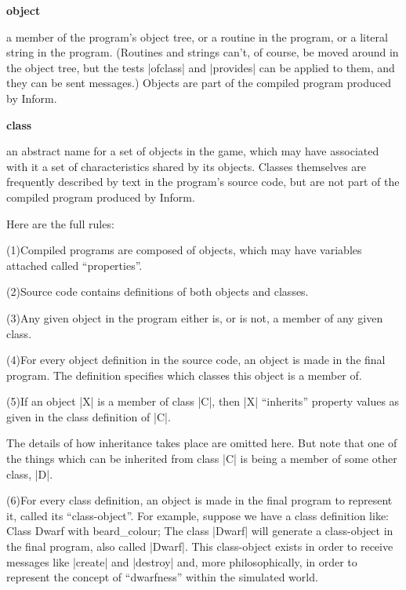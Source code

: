 \item{}{\bf object}
\item{}a member of the program's object tree, or a routine in the
program, or a literal string in the program.  (Routines and
strings can't, of course, be moved around in the object tree, but
the tests |ofclass| and |provides| can be applied to them, and
they can be sent messages.)  Objects are part of the compiled
program produced by Inform.
\item{}{\bf class}
\item{}an abstract name for a set of objects in the game, which may have
associated with it a set of characteristics shared by its objects.
Classes themselves are frequently described by text in the program's
source code, but are not part of the compiled program produced by Inform.

\medskip\noindent Here are the full rules:
\item{(1)}Compiled programs are composed of objects, which may have variables
attached called ``properties''.
\item{(2)}Source code contains definitions of both objects and classes.
\item{(3)}Any given object in the program either is, or is not, a member of
any given class.
\item{(4)}For every object definition in the source code, an object is made
in the final program.  The definition specifies which classes this object is
a member of.
\item{(5)}If an object |X| is a member of class |C|, then |X| ``inherits''
property values as given in the class definition of |C|.

\medskip\noindent The details of how inheritance takes place are omitted here.
But note that one of the things which can be inherited from class |C| is being
a member of some other class, |D|.
\medskip\noindent
\item{(6)}For every class definition, an object is made in the final program
to represent it, called its ``class-object''.
\medskip\noindent For example, suppose we have a class definition like:
\beginstt
    Class Dwarf
     with beard_colour;
\endtt
The class |Dwarf| will generate a class-object in the final program, also
called |Dwarf|.  This class-object exists in order to receive messages like
|create| and |destroy| and, more philosophically, in order to represent
the concept of ``dwarfness'' within the simulated world.

